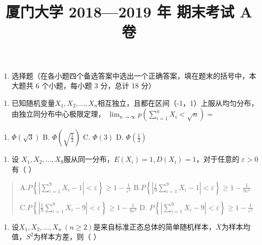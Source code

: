 \documentclass[fontset=exam]{exam-zh}
\title{厦门大学 2018—2019 年 期末考试 A 卷}
\begin{document}
\maketitle
{}
\begin{enumerate}
\item
  选择题（在各小题四个备选答案中选出一个正确答案，填在题末的括号中，本大题共 6 个小题，每小题 3 分，总计 18 分）
\end{enumerate}

\begin{enumerate}
\def\labelenumi{\arabic{enumi}.}
\item
  已知随机变量\(X_1,X_2,\ldots,X_n\)相互独立，且都在区间（-1，1）上服从均匀分布，由独立同分布中心极限定理， \(\lim_{n\to\infty}p\left(\sum_{i=1}^n X_i<\sqrt n\right)=\)\underline{\hspace{2cm}}
\end{enumerate}

\begin{enumerate}
\def\labelenumi{\Alph{enumi}.}
\item
  \(\Phi(\sqrt3)\) B. \(\Phi\left(\sqrt{\frac13}\right)\) C. \(\Phi(3)\) D. \(\Phi\left(\frac13\right)\)
\end{enumerate}

\begin{enumerate}
\def\labelenumi{\arabic{enumi}.}
\setcounter{enumi}{1}
\item
  设 \(X_1,X_2,\ldots,X_9\)服从同一分布，\(E(X_i)=1,D(X_i)=1\)，对于任意的 \(\varepsilon>0\)有（ ）
\end{enumerate}

\begin{quote}
A.\(P\left\{\left|\sum_{i=1}^9X_i-1\right|<\varepsilon\right\}\geq1-\frac1{\varepsilon^2}\) B.\(P\left\{\left|\frac19\sum_{i=1}^9X_i-1\right|<\varepsilon\right\}\geq1-\frac1{9\varepsilon^2}\)

C.\(P\left\{\left|\frac19\sum_{i=1}^9X_i-9\right|<\varepsilon\right\}\geq1-\frac1{9\varepsilon^2}\) D. \(P\left\{\left|\sum_{i=1}^9X_i-9\right|<\varepsilon\right\}\geq1-\frac1{\varepsilon^2}\)
\end{quote}

\begin{enumerate}
\def\labelenumi{\arabic{enumi}.}
\setcounter{enumi}{2}
\item
  设\(X_1,X_2,\ldots,X_n\ (n\geq2)\)是来自标准正态总体的简单随机样本，\(\overline X\)为样本均值，\(S^2\)为样本方差，则（ ）
\end{enumerate}
\end{document}
